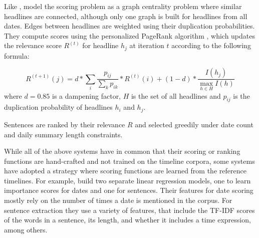 \documentclass[a4paper,BCOR=10mm]{report}
\numberwithin{lemma}{chapter}
\numberwithin{definition}{chapter}
\begin{document}
Like \citet{yan-trans}, \citet{tran-headlines} model the scoring problem as a graph centrality problem where similar headlines are connected, although only one graph is built for headlines from all dates.
Edges between headlines are weighted using their duplication probabilities.
They compute scores using the personalized PageRank algorithm \citep{topic-sensitive-pagerank}, which updates the relevance score $R^{(t)}$ for headline $h_j$ at iteration $t$ according to the following formula:

\begin{equation}
R^{(t + 1)}(j) = d * \sum_{i} \frac{p_{ij}}{\sum_{k} p_{ik}} * R^{(t)}(i) + (1 - d) * \frac{I(h_j)}{\max_{h \in H} I(h)}
\end{equation}
where $d = 0.85$ is a dampening factor, $H$ is the set of all headlines and $p_{ij}$ is the duplication probability of headlines $h_i$ and $h_j$.

Sentences are ranked by their relevance $R$ and selected greedily under date count and daily summary length constraints.





While all of the above systems have in common that their scoring or ranking functions are hand-crafted and not trained on the timeline corpora, some systems have adopted a strategy where scoring functions are learned from the reference timelines.
For example, \citet{tran-tl17} build two separate linear regression models, one to learn importance scores for dates and one for sentences.
Their features for date scoring mostly rely on the number of times a date is mentioned in the corpus.
For sentence extraction they use a variety of features, that include the TF-IDF scores of the words in a sentence, its length, and whether it includes a time expression, among others.
\end{document}
